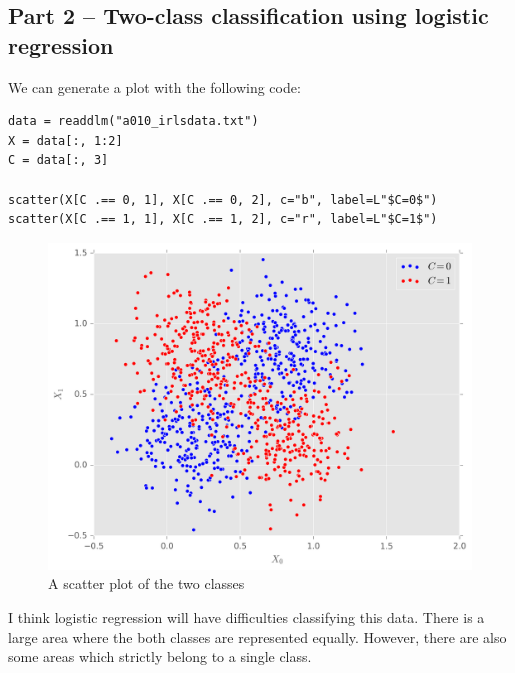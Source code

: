 \documentclass{article}
\begin{document}
\subsection*{Part 2 -- Two-class classification using logistic regression}
We can generate a plot with the following code:
\begin{lstlisting}
data = readdlm("a010_irlsdata.txt")
X = data[:, 1:2]
C = data[:, 3]

scatter(X[C .== 0, 1], X[C .== 0, 2], c="b", label=L"$C=0$")
scatter(X[C .== 1, 1], X[C .== 1, 2], c="r", label=L"$C=1$")
\end{lstlisting}
\begin{figure}[H]
\centering
\includegraphics[width=.6\linewidth]{images/scatter.png}
\caption{A scatter plot of the two classes}
\label{fig:scatter}
\end{figure}
I think logistic regression will have difficulties classifying this data. There is a large area where the both classes are represented equally. However, there are also some areas which strictly belong to a single class.
\end{document}
